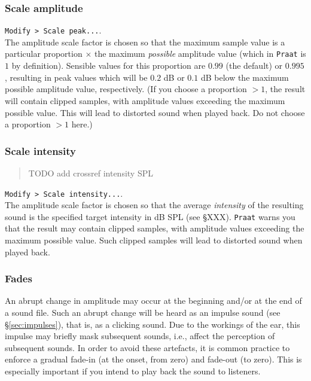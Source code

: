 \documentclass[
]{book}
\begin{document}
\label{box-praatscale}
\subsubsection{Scale amplitude}\label{scale-amplitude}

\texttt{Modify\ \textgreater{}\ Scale\ peak...}.\\
The amplitude scale factor is chosen so that the maximum sample value is a particular proportion \(\times\) the maximum \emph{possible} amplitude value (which in \texttt{Praat} is \(1\) by definition). Sensible values for this proportion are \(0.99\) (the default) or \(0.995\), resulting in peak values which will be \(0.2\) dB or \(0.1\) dB below the maximum possible amplitude value, respectively. (If you choose a proportion \(>1\), the result will contain clipped samples, with amplitude values exceeding the maximum possible value. This will lead to distorted sound when played back. Do not choose a proportion \(>1\) here.)

\subsubsection{Scale intensity}\label{scale-intensity}

\begin{quote}
TODO add crossref intensity SPL
\end{quote}

\texttt{Modify\ \textgreater{}\ Scale\ intensity...}.\\
The amplitude scale factor is chosen so that the average \emph{intensity} of the resulting sound is the specified target intensity in dB SPL (see §XXX). \texttt{Praat} warns you that the result may contain clipped samples, with amplitude values exceeding the maximum possible value. Such clipped samples will lead to distorted sound when played back.

\label{fades}
\subsubsection{Fades}\label{sec:fades}

An abrupt change in amplitude may occur at the beginning and/or at the end of a sound file. Such an abrupt change will be heard as an impulse sound (see §\ref{sec:impulses}), that is, as a clicking sound. Due to the workings of the ear, this impulse may briefly mask subsequent sounds, i.e., affect the perception of subsequent sounds. In order to avoid these artefacts, it is common practice to enforce a gradual fade-in (at the onset, from zero) and fade-out (to zero). This is especially important if you intend to play back the sound to listeners.
\end{document}
